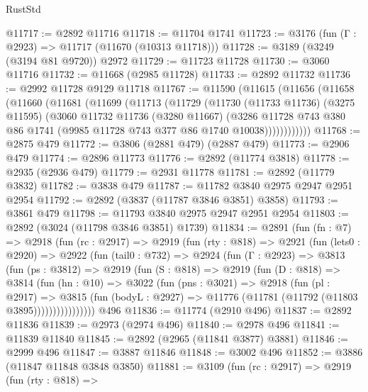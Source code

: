 \begin{lexlean}{RustStd}
\begin{coremodule}
@11717 := @2892 @11716
@11718 := @11704 @1741
@11723 := @3176 (fun (Γ : @2923) => @11717 (@11670 (@10313 @11718)))
@11728 := @3189 (@3249 (@3194 @81 @9720)) @2972
@11729 := @11723 @11728
@11730 := @3060 @11716
@11732 := @11668 (@2985 @11728)
@11733 := @2892 @11732
@11736 := @2992 @11728 @9129 @11718
@11767 := @11590
    (@11615
      (@11656
        (@11658
          (@11660
            (@11681
              (@11699
                (@11713
                  (@11729
                    (@11730
                      (@11733 @11736)
                      (@3275 @11595)
                      (@3060
                        @11732
                        @11736
                        (@3280 @11667)
                        (@3286
                          @11728
                          @743
                          @380
                          @86
                          @1741
                          (@9985 @11728 @743 @377 @86 @1740 @10038))))))))))))
@11768 := @2875 @479
@11772 := @3806 (@2881 @479) (@2887 @479)
@11773 := @2906 @479
@11774 := @2896 @11773
@11776 := @2892 (@11774 @3818)
@11778 := @2935 (@2936 @479)
@11779 := @2931 @11778
@11781 := @2892 (@11779 @3832)
@11782 := @3838 @479
@11787 := @11782 @3840 @2975 @2947 @2951 @2954
@11792 := @2892 (@3837 (@11787 @3846 @3851) @3858)
@11793 := @3861 @479
@11798 := @11793 @3840 @2975 @2947 @2951 @2954
@11803 := @2892 (@3024 (@11798 @3846 @3851) @1739)
@11834 := @2891
    (fun (fn : @7) =>
    @2918
      (fun (rc : @2917) =>
      @2919
        (fun (rty : @818) =>
        @2921
          (fun (lets0 : @2920) =>
          @2922
            (fun (tail0 : @732) =>
            @2924
              (fun (Γ : @2923) =>
              @3813
                (fun (ps : @3812) =>
                @2919
                  (fun (S : @818) =>
                  @2919
                    (fun (D : @818) =>
                    @3814
                      (fun (hn : @10) =>
                      @3022
                        (fun (pns : @3021) =>
                        @2918
                          (fun (pl : @2917) =>
                          @3815
                            (fun (bodyL : @2927) =>
                            @11776 (@11781 (@11792 (@11803 @3895))))))))))))))))
    @496
@11836 := @11774 (@2910 @496)
@11837 := @2892 @11836
@11839 := @2973 (@2974 @496)
@11840 := @2978 @496
@11841 := @11839 @11840
@11845 := @2892 (@2965 (@11841 @3877) @3881)
@11846 := @2999 @496
@11847 := @3887 @11846
@11848 := @3002 @496
@11852 := @3886 (@11847 @11848 @3848 @3850)
@11881 := @3109
    (fun (rc : @2917) =>
    @2919
      (fun (rty : @818) =>

\end{coremodule}
\end{lexlean}
